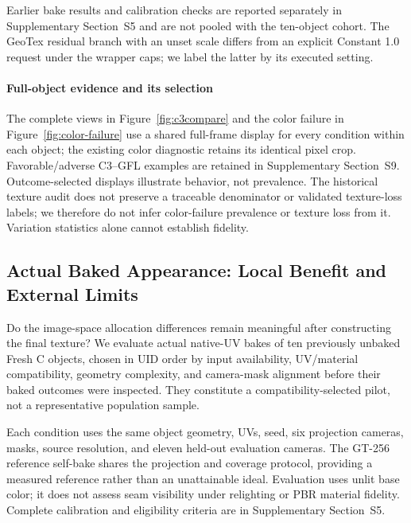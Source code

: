 \documentclass[times,twocolumn,final]{elsarticle}
\begin{document}
Earlier bake results and calibration checks are reported separately in Supplementary Section~S5 and are not pooled with the ten-object cohort. The GeoTex residual branch with an unset scale differs from an explicit Constant 1.0 request under the wrapper caps; we label the latter by its executed setting.

\paragraph{Full-object evidence and its selection}
The complete views in Figure~\ref{fig:c3compare} and the color failure in Figure~\ref{fig:color-failure} use a shared full-frame display for every condition within each object; the existing color diagnostic retains its identical pixel crop. Favorable/adverse C3--GFL examples are retained in Supplementary Section~S9. Outcome-selected displays illustrate behavior, not prevalence. The historical texture audit does not preserve a traceable denominator or validated texture-loss labels; we therefore do not infer color-failure prevalence or texture loss from it. Variation statistics alone cannot establish fidelity.


\subsection{Actual Baked Appearance: Local Benefit and External Limits}
\label{subsec:new-bake}

Do the image-space allocation differences remain meaningful after constructing the final texture? We evaluate actual native-UV bakes of ten previously unbaked Fresh C objects, chosen in UID order by input availability, UV/material compatibility, geometry complexity, and camera-mask alignment before their baked outcomes were inspected. They constitute a compatibility-selected pilot, not a representative population sample.

Each condition uses the same object geometry, UVs, seed, six projection cameras, masks, source resolution, and eleven held-out evaluation cameras. The GT-256 reference self-bake shares the projection and coverage protocol, providing a measured reference rather than an unattainable ideal. Evaluation uses unlit base color; it does not assess seam visibility under relighting or PBR material fidelity. Complete calibration and eligibility criteria are in Supplementary Section~S5.
\end{document}
